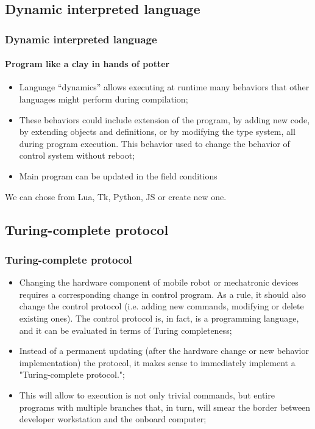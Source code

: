 \documentclass{beamer}
\begin{document}
\subsection{Dynamic interpreted language}
\begin{frame}
\frametitle{Dynamic interpreted language}
\framesubtitle{Program like a clay in hands of potter}
\begin{itemize}
\item<1>Language “dynamics” allows executing at runtime many behaviors that other languages might perform during compilation;
\item<1>These behaviors could include extension of the program, by adding new code, by extending objects and definitions, or by modifying the type system, 
all during program execution. This behavior used to change the behavior of control system without reboot;
\item<1>Main program can be updated in the field conditions
\end{itemize}
We can chose from Lua, Tk, Python, JS or create new one.
\end{frame}

\subsection{Turing-complete protocol}
\begin{frame}
\frametitle{Turing-complete protocol}
\begin{itemize}
\item<1>Changing the hardware component of mobile robot or mechatronic devices requires a corresponding change in control
program. As a rule, it should also change the control protocol (i.e. adding new commands, modifying or delete existing ones). The control protocol is, in fact, is a programming language, and it can be evaluated in terms of Turing completeness;
\item<1>Instead of a permanent updating (after the hardware change or new behavior implementation) the protocol, it makes sense to
immediately implement a "Turing-complete protocol.";
\item<1>This will allow to execution is not only trivial commands, but entire programs with multiple branches that, in turn,
will smear the border between developer workstation and the onboard computer;
\end{itemize}
\end{frame}
\end{document}
